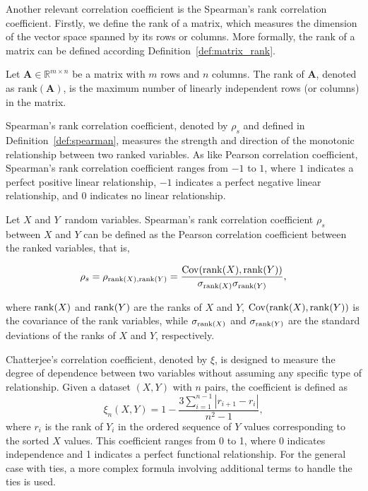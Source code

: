 Another relevant correlation coefficient is the Spearman's rank correlation coefficient. Firstly, we define the rank of a matrix, which measures the dimension of the vector space spanned by its rows or columns. More formally, the rank of a matrix can be defined according Definition~\ref{def:matrix_rank}.

\begin{definition} \label{def:matrix_rank}
Let $\mathbf{A} \in \mathbb{R}^{m \times n}$ be a matrix with $m$ rows and $n$ columns. The rank of $\mathbf{A}$, denoted as $\text{rank}(\mathbf{A})$, is the maximum number of linearly independent rows (or columns) in the matrix.
\end{definition}

Spearman's rank correlation coefficient, denoted by $\rho_s$ and defined in Definition~\ref{def:spearman}, measures the strength and direction of the monotonic relationship between two ranked variables.  As like Pearson correlation coefficient, Spearman's rank correlation coefficient ranges from $-1$ to $1$, where $1$ indicates a perfect positive linear relationship, $-1$ indicates a perfect negative linear relationship, and $0$ indicates no linear relationship.
 
\begin{definition}\label{def:spearman}
Let  $X$ and $Y$\ random variables. Spearman's rank correlation coefficient  $\rho_s$ between $X$ and $Y$ can be defined as the Pearson correlation coefficient between the ranked variables, that is, 

\begin{equation}\label{eq:spearman}
\rho_s = \rho_{\operatorname{rank}(X),\operatorname{rank}(Y)} = \frac{\mathrm{Cov}(\operatorname{rank}(X), \operatorname{rank}(Y))}{\sigma_{\operatorname{rank}(X)} \sigma_{\operatorname{rank}(Y)}},
\end{equation}

where $\operatorname{rank}(X)$ and $\operatorname{rank}(Y)$ are the ranks of $X$ and $Y$, $\mathrm{Cov}(\operatorname{rank}(X), \operatorname{rank}(Y))$ is the covariance of the rank variables, while $\sigma_{\operatorname{rank}(X)}$ and $\sigma_{\operatorname{rank}(Y)}$ are the standard deviations of the ranks of $X$ and $Y$, respectively.
\end{definition}

Chatterjee's correlation coefficient, denoted by $\xi$, is designed to measure the degree of dependence between two variables without assuming any specific type of relationship. Given a dataset $(X, Y)$ with $n$ pairs, the coefficient is defined as
\begin{equation}
\xi_n(X,Y) = 1 - \frac{3 \sum_{i=1}^{n-1} |r_{i+1} - r_i|}{n^2 - 1},
\end{equation}
where $r_i$ is the rank of $Y_i$ in the ordered sequence of $Y$ values corresponding to the sorted $X$ values. This coefficient ranges from 0 to 1, where 0 indicates independence and 1 indicates a perfect functional relationship. For the general case with ties, a more complex formula involving additional terms to handle the ties is used.

